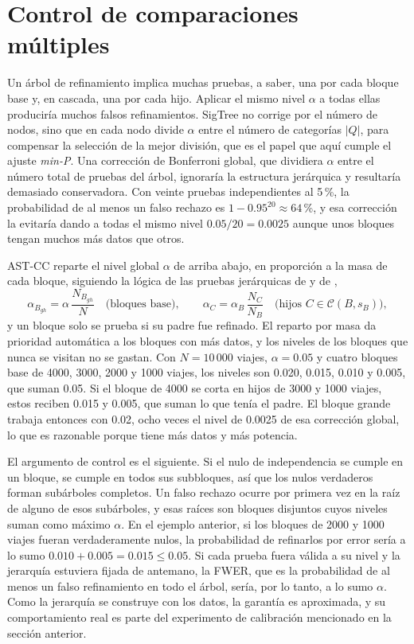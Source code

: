 \section{Control de comparaciones múltiples}\label{sec:prop-multiplicidad}

Un árbol de refinamiento implica muchas pruebas, a saber, una por cada bloque base
y, en cascada, una por cada hijo. Aplicar el mismo nivel $\alpha$ a todas ellas
produciría muchos falsos refinamientos. SigTree \citep{Hu2025} no corrige por
el número de nodos, sino que en cada nodo divide $\alpha$ entre el número de
categorías $|Q|$, para compensar la selección de la mejor división, que
es el papel que aquí cumple el ajuste \emph{min-P}. Una corrección de Bonferroni
global, que dividiera $\alpha$ entre el número total de pruebas del árbol,
ignoraría la estructura jerárquica y resultaría demasiado conservadora. Con
veinte pruebas independientes al 5\,\%, la probabilidad de al menos un falso
rechazo es $1-0.95^{20}\approx 64$\,\%, y esa corrección la evitaría dando a
todas el mismo nivel $0.05/20 = 0.0025$ aunque unos bloques tengan muchos más
datos que otros.

AST-CC reparte el nivel global $\alpha$ de arriba abajo, en proporción a la masa
de cada bloque, siguiendo la lógica de las pruebas jerárquicas de
\citet{Meinshausen2008} y de \citet{Kimes2017},
\begin{equation}\label{eq:prop-alpha}
  \alpha_{B_{gh}} = \alpha\,\frac{N_{B_{gh}}}{N}\quad\text{(bloques base)},
  \qquad
  \alpha_{C} = \alpha_B\,\frac{N_C}{N_B}\quad\text{(hijos } C\in\mathcal{C}(B,s_B)\text{)},
\end{equation}
y un bloque solo se prueba si su padre fue refinado. El reparto por masa da
prioridad automática a los bloques con más datos, y los niveles de los bloques
que nunca se visitan no se gastan. Con $N=10\,000$ viajes, $\alpha=0.05$ y cuatro
bloques base de 4000, 3000, 2000 y 1000 viajes, los niveles son 0.020, 0.015, 0.010
y 0.005, que suman 0.05. Si el bloque de 4000 se corta en hijos de 3000 y 1000
viajes, estos reciben 0.015 y 0.005, que suman lo que tenía el padre. El bloque
grande trabaja entonces con 0.02, ocho veces el nivel de 0.0025 de esa corrección global, lo
que es razonable porque tiene más datos y más potencia.

El argumento de control es el siguiente. Si el nulo de independencia se cumple
en un bloque, se cumple en todos sus subbloques, así que los nulos verdaderos
forman subárboles completos. Un falso rechazo ocurre por primera vez en la raíz
de alguno de esos subárboles, y esas raíces son bloques disjuntos cuyos niveles
suman como máximo $\alpha$. En el ejemplo anterior, si los bloques de 2000 y 1000
viajes fueran verdaderamente nulos, la probabilidad de refinarlos por error sería a
lo sumo $0.010+0.005=0.015\le 0.05$. Si cada prueba fuera válida a su nivel y la
jerarquía estuviera fijada de antemano, la \ac{FWER}, que es
la probabilidad de al menos un falso refinamiento en todo el árbol, sería, por lo
tanto, a lo sumo $\alpha$. Como la jerarquía se construye con los
datos, la garantía es aproximada, y su comportamiento real es parte del
experimento de calibración mencionado en la sección anterior.

